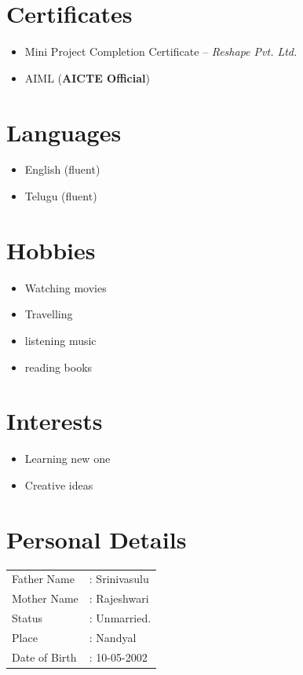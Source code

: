 \documentclass[a4paper,11pt]{article}
\begin{document}
\section{Certificates}
\begin{itemize}
    \item Mini Project Completion Certificate -- \textit{Reshape Pvt. Ltd.}
    \item AIML (\textbf{AICTE Official})
\end{itemize}

\section{Languages}
\begin{itemize}
    \item English (fluent)
    \item Telugu (fluent)
\end{itemize}

\section{Hobbies}
\begin{itemize}
    \item Watching movies
    \item Travelling
    \item listening music
    \item reading books
\end{itemize}

\section{Interests}
\begin{itemize}
    \item Learning new one
    \item Creative ideas
\end{itemize}

\section{Personal Details}
\begin{tabular}{ll}
Father Name & : Srinivasulu \\
Mother Name & : Rajeshwari \\
Status & : Unmarried. \\
Place & : Nandyal \\
Date of Birth & : 10-05-2002
\end{tabular}
\end{document}
